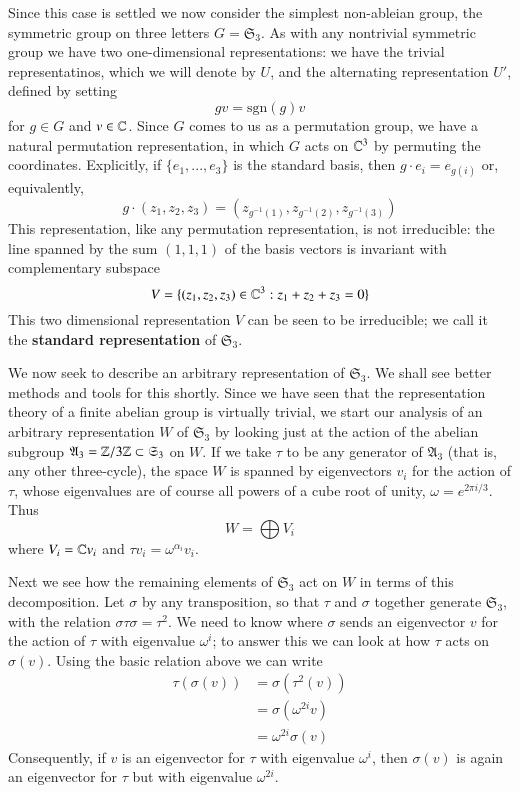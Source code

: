 Since this case is settled we now consider the simplest non-ableian group, the symmetric group on three letters $G = \mathfrak{S}_3$. As with any nontrivial symmetric group we have two one-dimensional representations: we have the trivial representatinos, which we will denote by $U$, and the alternating representation $U'$, defined by setting \begin{equation*}
    gv = \text{sgn}(g)v
\end{equation*}
for $g \in G$ and $v \in \mathbb C$. Since $G$ comes to us as a permutation group, we have a natural permutation representation, in which $G$ acts on $\mathbb C^3$ by permuting the coordinates. Explicitly, if $\{e_1,...,e_3\}$ is the standard basis, then $g\cdot e_i = e_{g(i)}$ or, equivalently, $$g\cdot(z_1,z_2,z_3) = (z_{g^{-1}(1)},z_{g^{-1}(2)},z_{g^{-1}(3)})$$
This representation, like any permutation representation, is not irreducible: the line spanned by the sum $(1,1,1)$ of the basis vectors is invariant with complementary subspace \begin{equation*}
    V = \{(z_1,z_2,z_3) \in \mathbb C^3:z_1+z_2+z_3 = 0\}
\end{equation*}
This two dimensional representation $V$ can be seen to be irreducible; we call it the \textbf{standard representation} of $\mathfrak{S}_3$.

We now seek to describe an arbitrary representation of $\mathfrak{S}_3$. We shall see better methods and tools for this shortly. Since we have seen that the representation theory of a finite abelian group is virtually trivial, we start our analysis of an arbitrary representation $W$ of $\mathfrak{S}_3$ by looking just at the action of the abelian subgroup $\mathfrak{A}_3 = \mathbb Z/3\mathbb Z \subset \mathfrak{S}_3$ on $W$. If we take $\tau$ to be any generator of $\mathfrak{A}_3$ (that is, any other three-cycle), the space $W$ is spanned by eigenvectors $v_i$ for the action of $\tau$, whose eigenvalues are of course all powers of a cube root of unity, $\omega = e^{2\pi i/3}$. Thus \begin{equation*}
    W = \bigoplus V_i
\end{equation*}
where $V_i = \mathbb C v_i$ and $\tau v_i = \omega^{\alpha_i}v_i$.

Next we see how the remaining elements of $\mathfrak{S}_3$ act on $W$ in terms of this decomposition. Let $\sigma$ by any transposition, so that $\tau$ and $\sigma$ together generate $\mathfrak{S}_3$, with the relation $\sigma\tau\sigma = \tau^2$. We need to know where $\sigma$ sends an eigenvector $v$ for the action of $\tau$ with eigenvalue $\omega^i$; to answer this we can look at how $\tau$ acts on $\sigma(v)$. Using the basic relation above we can write \begin{align*}
    \tau(\sigma(v)) &= \sigma(\tau^2(v)) \\
    &= \sigma(\omega^{2i}v) \\
    &= \omega^{2i}\sigma(v)
\end{align*}
Consequently, if $v$ is an eigenvector for $\tau$ with eigenvalue $\omega^i$, then $\sigma(v)$ is again an eigenvector for $\tau$ but with eigenvalue $\omega^{2i}$. 

